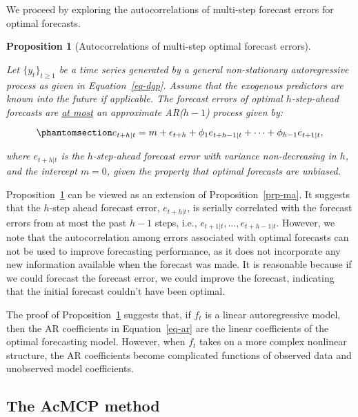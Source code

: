 \documentclass[
  11pt,
  a4paper,
]{article}
\theoremstyle{plain}
\newtheorem{proposition}{Proposition}[section]
\theoremstyle{remark}
\begin{document}
We proceed by exploring the autocorrelations of multi-step forecast
errors for optimal forecasts.

\begin{proposition}[Autocorrelations of multi-step optimal forecast
errors]\protect\hypertarget{prp-ar}{}\label{prp-ar}

Let \(\{y_t\}_{t \geq 1}\) be a time series generated by a general
non-stationary autoregressive process as given in Equation~\ref{eq-dgp}.
Assume that the exogenous predictors are known into the future if
applicable. The forecast errors of optimal \(h\)-step-ahead forecasts
are \ul{at most} an approximate AR(\(h-1\)) process given by:

\begin{equation}\phantomsection\label{eq-ar}{
e_{t+h|t} = m + \epsilon_{t+h} + \phi_1e_{t+h-1|t} + \cdots + \phi_{h-1}e_{t+1|t},
}\end{equation}

where \(e_{t+h|t}\) is the \(h\)-step-ahead forecast error with variance
non-decreasing in \(h\), and the intercept \(m=0\), given the property
that optimal forecasts are unbiased.

\end{proposition}

Proposition~\ref{prp-ar} can be viewed as an extension of
Proposition~\ref{prp-ma}. It suggests that the \(h\)-step ahead forecast
error, \(e_{t+h|t}\), is serially correlated with the forecast errors
from at most the past \(h-1\) steps, i.e.,
\(e_{t+1|t}, \ldots, e_{t+h-1|t}\). However, we note that the
autocorrelation among errors associated with optimal forecasts can not
be used to improve forecasting performance, as it does not incorporate
any new information available when the forecast was made. It is
reasonable because if we could forecast the forecast error, we could
improve the forecast, indicating that the initial forecast couldn't have
been optimal.

The proof of Proposition~\ref{prp-ar} suggests that, if \(f_t\) is a
linear autoregressive model, then the AR coefficients in
Equation~\ref{eq-ar} are the linear coefficients of the optimal
forecasting model. However, when \(f_t\) takes on a more complex
nonlinear structure, the AR coefficients become complicated functions of
observed data and unobserved model coefficients.

\subsection{The AcMCP method}\label{sec-novel}
\end{document}
